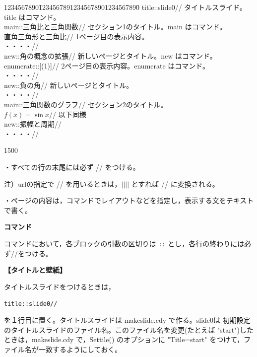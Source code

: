 \documentclass[papersize,a4paper,12pt,uplatex]{jsarticle}
\begin{document}
\begin{tabbing}
1234567890\=12345678912345678901234567890\=\kill
 \>title::slide0//\> タイトルスライド。title はコマンド。\\
 \>main::三角比と三角関数//\> セクション1のタイトル。main はコマンド。\\
 \>直角三角形と三角比//\> 1ページ目の表示内容。\\
 \>・・・・// \\
 \> new::角の概念の拡張//\> 新しいページとタイトル。new はコマンド。\\
 \> enumerate::[(1)]// \> 2ページ目の表示内容。enumerate はコマンド。\\
 \> ・・・・//\\
 \> new::負の角//\> 新しいページとタイトル。\\
 \> ・・・・//\\
 \>main::三角関数のグラフ//\> セクション2のタイトル。\\
 \>$f(x)=\sin x$//\> \hspace{10mm}以下同様\\
 \> new::振幅と周期// \\
 \> ・・・・//\\ 
\end{tabbing}
\begin{layer}{150}{0}
\hspace{7mm}
\end{layer}


・すべての行の末尾には必ず // をつける。

\hspace{10mm} 注）urlの指定で // を用いるときは，$||||$ とすれば // に変換される。

・ページの内容は，コマンドでレイアウトなどを指定し，表示する文をテキストで書く。

\vspace{\baselineskip}
{\bf コマンド}

コマンドにおいて，各ブロックの引数の区切りは \verb|::| とし，各行の終わりには必ず//をつける。
 
\vspace{\baselineskip}
 {\bf 【タイトルと壁紙】}
 
 タイトルスライドをつけるときは，
 
 \hspace{10mm}\verb|title::slide0//|
 
 を１行目に置く。タイトルスライドは makeslide.cdy で作る。slide0は 初期設定のタイトルスライドのファイル名。このファイル名を変更(たとえば "start")したときは，makeslide.cdy で，Settile() のオプションに "Title=start" をつけて，ファイル名が一致するようにしておく。
 
\end{document}
